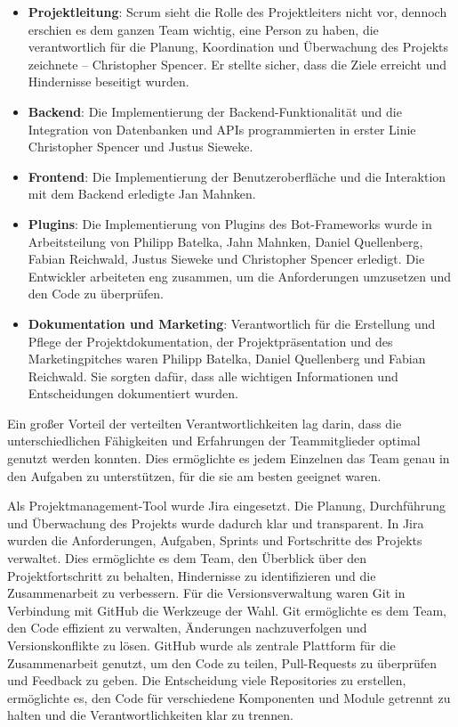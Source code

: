 \begin{itemize}
    \item \textbf{Projektleitung}: Scrum sieht die Rolle des Projektleiters nicht vor, dennoch erschien es dem ganzen Team wichtig, eine Person zu haben, die verantwortlich für die Planung, Koordination und Überwachung des Projekts zeichnete – Christopher Spencer. Er stellte sicher, dass die Ziele erreicht und Hindernisse beseitigt wurden.
    \item \textbf{Backend}: Die Implementierung der Backend-Funktionalität und die Integration von Datenbanken und APIs programmierten in erster Linie Christopher Spencer und Justus Sieweke.
    \item \textbf{Frontend}: Die Implementierung der Benutzeroberfläche und die Interaktion mit dem Backend erledigte Jan Mahnken.
    \item \textbf{Plugins}: Die Implementierung von Plugins des Bot-Frameworks wurde in Arbeitsteilung von Philipp Batelka, Jahn Mahnken, Daniel Quellenberg, Fabian Reichwald, Justus Sieweke und Christopher Spencer erledigt. Die Entwickler arbeiteten eng zusammen, um die Anforderungen umzusetzen und den Code zu überprüfen.
    \item \textbf{Dokumentation und Marketing}: Verantwortlich für die Erstellung und Pflege der Projektdokumentation, der Projektpräsentation und des Marketingpitches waren Philipp Batelka, Daniel Quellenberg und Fabian Reichwald. Sie sorgten dafür, dass alle wichtigen Informationen und Entscheidungen dokumentiert wurden.
\end{itemize}

Ein großer Vorteil der verteilten Verantwortlichkeiten lag darin, dass die unterschiedlichen Fähigkeiten und Erfahrungen der Teammitglieder optimal genutzt werden konnten. Dies ermöglichte es jedem Einzelnen das Team genau in den Aufgaben zu unterstützen, für die sie am besten geeignet waren. 

Als Projektmanagement-Tool wurde \gls{Jira} eingesetzt. Die Planung, Durchführung und Überwachung des Projekts wurde dadurch klar und transparent. In Jira wurden die Anforderungen, Aufgaben, Sprints und Fortschritte des Projekts verwaltet. Dies ermöglichte es dem Team, den Überblick über den Projektfortschritt zu behalten, Hindernisse zu identifizieren und die Zusammenarbeit zu verbessern. Für die Versionsverwaltung waren \gls{Git} in Verbindung mit \gls{GitHub} die Werkzeuge der Wahl. Git ermöglichte es dem Team, den Code effizient zu verwalten, Änderungen nachzuverfolgen und Versionskonflikte zu lösen. GitHub wurde als zentrale Plattform für die Zusammenarbeit genutzt, um den Code zu teilen, \gls{Pull-Requests} zu überprüfen und Feedback zu geben. Die Entscheidung viele Repositories zu erstellen, ermöglichte es, den Code für verschiedene Komponenten und Module getrennt zu halten und die Verantwortlichkeiten klar zu trennen.


